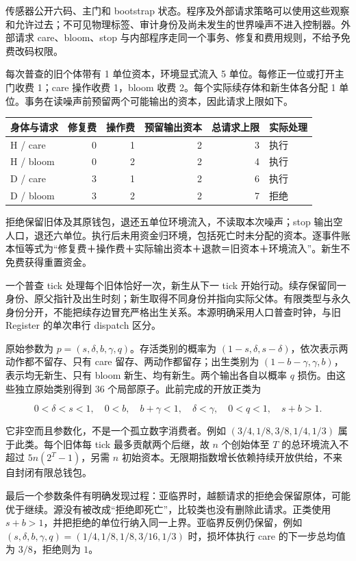 \documentclass[
  11pt,
  oneside]{book}
\newcounter{none} %
\begin{document}
传感器公开六码、主门和 bootstrap 状态。程序及外部请求策略可以使用这些观察和允许过去；不可见物理标签、审计身份及尚未发生的世界噪声不进入控制器。外部请求 care、bloom、stop 与内部程序走同一个事务、修复和费用规则，不给予免费改码权限。

每次普查的旧个体带有 1 单位资本，环境显式流入 5 单位。每修正一位或打开主门收费 1；care 操作收费 1，bloom 收费 2。每个实际续存体和新生体各分配 1 单位。事务在读噪声前预留两个可能输出的资本，因此请求上限如下。

{\def\LTcaptype{none} %
\begin{longtable}[]{@{}lrrrrl@{}}
\toprule\noalign{}
身体与请求 & 修复费 & 操作费 & 预留输出资本 & 总请求上限 & 实际处理 \\
\midrule\noalign{}
\endhead
\bottomrule\noalign{}
\endlastfoot
H / care & 0 & 1 & 2 & 3 & 执行 \\
H / bloom & 0 & 2 & 2 & 4 & 执行 \\
D / care & 3 & 1 & 2 & 6 & 执行 \\
D / bloom & 3 & 2 & 2 & 7 & 拒绝 \\
\end{longtable}
}

拒绝保留旧体及其原钱包，退还五单位环境流入，不读取本次噪声；stop 输出空人口，退还六单位。执行后未用资金归环境，包括死亡时未分配的资本。逐事件账本恒等式为``修复费＋操作费＋实际输出资本＋退款＝旧资本＋环境流入''。新生不免费获得重置资金。

一个普查 tick 处理每个旧体恰好一次，新生从下一 tick 开始行动。续存保留同一身份、原父指针及出生时刻；新生取得不同身份并指向实际父体。有限类型与永久身份分开，不能把续存边冒充严格出生关系。本源明确采用人口普查时钟，与旧 Register 的单次串行 dispatch 区分。

原始参数为 \(p=(s,\delta,b,\gamma,q)\)。存活类别的概率为 \((1-s,\delta,s-\delta)\)，依次表示两动作都不留存、只有 care 留存、两动作都留存；出生类别为 \((1-b-\gamma,\gamma,b)\)，表示均无新生、只有 bloom 新生、均有新生。两个输出各自以概率 \(q\) 损伤。由这些独立原始类别得到 36 个局部原子。此前完成的开放正类为

\[0<\delta<s<1,\quad 0<b,\quad b+\gamma<1,\quad
\delta<\gamma,\quad 0<q<1,\quad s+b>1.\]

它非空而且参数化，不是一个孤立数字消费者。例如 \((3/4,1/8,3/8,1/4,1/3)\) 属于此类。每个旧体每 tick 最多贡献两个后继，故 \(n\) 个创始体至 \(T\) 的总环境流入不超过 \(5n(2^T-1)\)，另需 \(n\) 初始资本。无限期指数增长依赖持续开放供给，不来自封闭有限总钱包。

最后一个参数条件有明确发现过程：亚临界时，越额请求的拒绝会保留原体，可能优于继续。源没有被改成``拒绝即死亡''，比较类也没有删除此请求。正类使用 \(s+b>1\)，并把拒绝的单位行纳入同一上界。亚临界反例仍保留，例如 \((s,\delta,b,\gamma,q)=(1/4,1/8,1/8,3/16,1/3)\) 时，损坏体执行 care 的下一步总均值为 \(3/8\)，拒绝则为 \(1\)。
\end{document}
